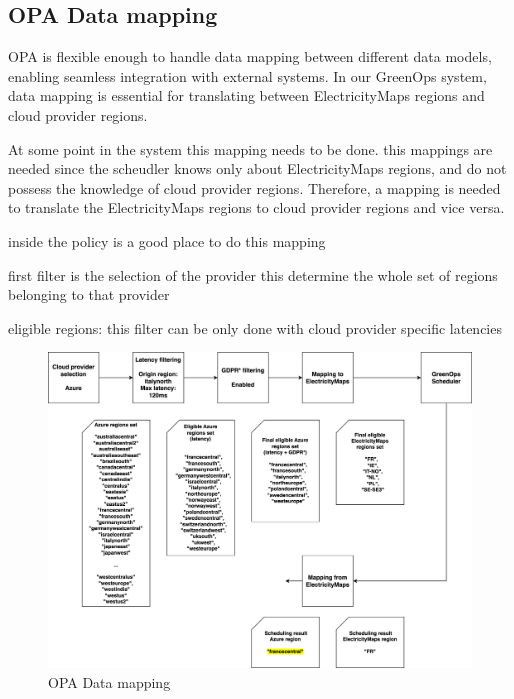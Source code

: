 \subsection{OPA Data mapping}

OPA is flexible enough to handle data mapping between different data models, enabling seamless integration with external systems. In our GreenOps system, data mapping is essential for translating between ElectricityMaps regions and cloud provider regions. 


At some point in the system this mapping needs to be done.
this mappings are needed since the scheudler knows only about ElectricityMaps regions, and do not possess the knowledge of cloud provider regions. Therefore, a mapping is needed to translate the ElectricityMaps regions to cloud provider regions and vice versa.

inside the policy is a good place to do this mapping


first filter is the selection of the provider
this determine the whole set of regions belonging to that provider

eligible regions: this filter can be only done with cloud provider specific latencies

\begin{figure}[H]
  \centering
  \includegraphics[width=1\linewidth]{images/data_mapping.png}
  \caption{OPA Data mapping}
  \label{fig:data_mapping}
\end{figure}


